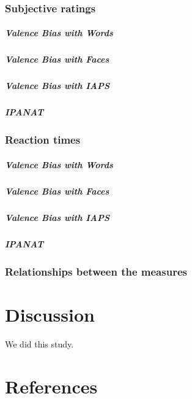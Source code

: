 \documentclass[man]{apa6}
\let\oldsubparagraph\subparagraph
\renewcommand{\subparagraph}[1]{\oldsubparagraph{#1}\mbox{}}
\begin{document}
\hypertarget{subjective-ratings-1}{%
\subsubsection{Subjective ratings}\label{subjective-ratings-1}}

\hypertarget{valence-bias-with-words-1}{%
\subparagraph{Valence Bias with Words}\label{valence-bias-with-words-1}}

\hypertarget{valence-bias-with-faces-1}{%
\subparagraph{Valence Bias with Faces}\label{valence-bias-with-faces-1}}

\hypertarget{valence-bias-with-iaps-1}{%
\subparagraph{Valence Bias with IAPS}\label{valence-bias-with-iaps-1}}

\hypertarget{ipanat-3}{%
\subparagraph{IPANAT}\label{ipanat-3}}

\hypertarget{reaction-times-1}{%
\subsubsection{Reaction times}\label{reaction-times-1}}

\hypertarget{valence-bias-with-words-2}{%
\subparagraph{Valence Bias with Words}\label{valence-bias-with-words-2}}

\hypertarget{valence-bias-with-faces-2}{%
\subparagraph{Valence Bias with Faces}\label{valence-bias-with-faces-2}}

\hypertarget{valence-bias-with-iaps-2}{%
\subparagraph{Valence Bias with IAPS}\label{valence-bias-with-iaps-2}}

\hypertarget{ipanat-4}{%
\subparagraph{IPANAT}\label{ipanat-4}}

\hypertarget{relationships-between-the-measures}{%
\subsubsection{Relationships between the measures}\label{relationships-between-the-measures}}

\hypertarget{discussion}{%
\section{Discussion}\label{discussion}}

We did this study.

\newpage

\hypertarget{references}{%
\section{References}\label{references}}
\end{document}
